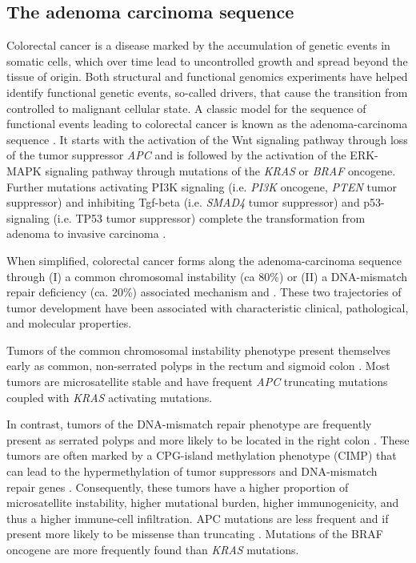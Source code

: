 \begin{flushleft}
\subsection{The adenoma carcinoma sequence}
Colorectal cancer is a disease marked by the accumulation of genetic events in somatic cells, which over time lead to uncontrolled growth and spread beyond the tissue of origin. Both structural and functional genomics experiments have helped identify functional genetic events, so-called drivers, that cause the transition from controlled to malignant cellular state. A classic model for the sequence of functional events leading to colorectal cancer is known as the adenoma-carcinoma sequence \parencite{vogelsteinGeneticAlterationsColorectaltumor1988}. It starts with the activation of the Wnt signaling pathway through loss of the tumor suppressor \textit{APC} and is followed by the activation of the ERK-MAPK signaling pathway through mutations of the \textit{KRAS} or \textit{BRAF} oncogene. Further mutations activating PI3K signaling (i.e. \textit{PI3K} oncogene, \textit{PTEN} tumor suppressor) and inhibiting Tgf-beta (i.e. \textit{SMAD4} tumor suppressor) and p53-signaling (i.e. TP53 tumor suppressor) complete the transformation from adenoma to invasive carcinoma \parencite{fearonMolecularGeneticsColorectal2011}. \par

When simplified, colorectal cancer forms along the adenoma-carcinoma sequence through (I) a common chromosomal instability (ca 80\%) or (II) a DNA-mismatch repair deficiency (ca. 20\%) associated mechanism \parencite{markowitzMolecularOriginsCancer2009} and \parencite{pancioneGeneticEpigeneticEvents2012}. These two trajectories of tumor development have been associated with characteristic clinical, pathological, and molecular properties. 
\par

Tumors of the common chromosomal instability phenotype present themselves early as common, non-serrated polyps in the rectum and sigmoid colon \parencite{markowitzMolecularOriginsCancer2009}. Most tumors are microsatellite stable and have frequent \textit{APC} truncating mutations coupled with \textit{KRAS} activating mutations. 
\par 

In contrast, tumors of the DNA-mismatch repair phenotype are frequently present as serrated polyps and more likely to be located in the right colon \parencite{markowitzMolecularOriginsCancer2009}. These tumors are often marked by a CPG-island methylation phenotype (CIMP) that can lead to the hypermethylation of tumor suppressors and DNA-mismatch repair genes \parencite{oginoCpGIslandMethylator2009}. Consequently, these tumors have a higher proportion of microsatellite instability, higher mutational burden, higher immunogenicity, and thus a higher immune-cell infiltration. APC mutations are less frequent and if present more likely to be missense than truncating \parencite{borowskyRoleAPCWNT2018}. Mutations of the BRAF oncogene are more frequently found than \textit{KRAS} mutations. 
\par


\end{flushleft}
